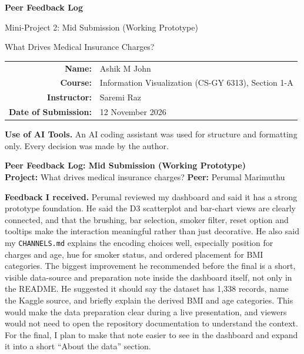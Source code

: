 \documentclass[11pt]{article}
\begin{document}
\begin{titlepage}
\centering
\vspace*{1.5in}
{\Huge\bfseries Peer Feedback Log\par}
\vspace{0.25in}
{\Large Mini-Project 2: Mid Submission (Working Prototype)\par}
\vspace{0.1in}
{\large What Drives Medical Insurance Charges?\par}
\vspace{1in}

{\large
\renewcommand{\arraystretch}{1.6}
\begin{tabular}{@{} r l @{}}
\textbf{Name:} & Ashik M John \\
\textbf{Course:} & Information Visualization (CS-GY 6313), Section 1-A \\
\textbf{Instructor:} & Saremi Raz \\
\textbf{Date of Submission:} & 12 November 2026 \\
\end{tabular}
\par}

\vfill

\begin{minipage}{0.85\textwidth}
\raggedright
\textbf{Use of AI Tools.} An AI coding assistant was used for structure and formatting only. Every decision was made by the author.
\end{minipage}
\end{titlepage}

{\large\textbf{Peer Feedback Log: Mid Submission (Working Prototype)}}\\[0.2em]
\textbf{Project:} What drives medical insurance charges? \quad
\textbf{Peer:} Perumal Marimuthu

\textbf{Feedback I received.} Perumal reviewed my dashboard and said it has a strong prototype foundation. He said the D3 scatterplot and bar-chart views are clearly connected, and that the brushing, bar selection, smoker filter, reset option and tooltips make the interaction meaningful rather than just decorative. He also said my \texttt{CHANNELS.md} explains the encoding choices well, especially position for charges and age, hue for smoker status, and ordered placement for BMI categories. The biggest improvement he recommended before the final is a short, visible data-source and preparation note inside the dashboard itself, not only in the README. He suggested it should say the dataset has 1,338 records, name the Kaggle source, and briefly explain the derived BMI and age categories. This would make the data preparation clear during a live presentation, and viewers would not need to open the repository documentation to understand the context. For the final, I plan to make that note easier to see in the dashboard and expand it into a short ``About the data'' section.
\end{document}
